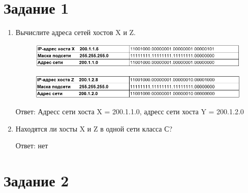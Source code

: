 \documentclass[bachelor, och, labwork]{shiza}
\begin{document}
\tableofcontents

\section{Задание 1}

\begin{enumerate}
    \item Вычислите адреса сетей хостов X и Z. 
    
    \begin{figure}[H]
        \centering      %
        \includegraphics[width=1\textwidth]{1}
        \label{fig:image1}
    \end{figure}

    \begin{figure}[H]
        \centering      %
        \includegraphics[width=1\textwidth]{2}
        \label{fig:image1}
    \end{figure}
    
    Ответ: Адресс сети хоста X = 200.1.1.0, адресс сети хоста Y = 200.1.2.0
    
    \item Находятся ли хосты X и Z в одной сети класса С? 
    
    Ответ: нет
\end{enumerate}

\section{Задание 2}
\end{document}
